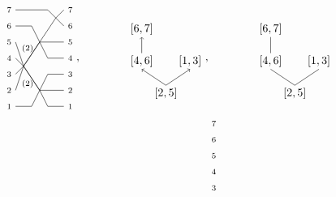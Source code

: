 \documentclass[11pt]{article}
\theoremstyle{definition}
\numberwithin{equation}{section}
\begin{document}
\begin{equation}\label{eq:posetex}
  \begin{gathered}
\begin{tikzpicture}[scale=.5,baseline=55]
  \node at (-.4,7) {$\scriptstyle 7$};
  \node at (-.4,6) {$\scriptstyle 6$};
  \node at (-.4,5) {$\scriptstyle 5$};
  \node at (-.4,4) {$\scriptstyle 4$};
  \node at (-.4,3) {$\scriptstyle 3$};
  \node at (-.4,2) {$\scriptstyle 2$};
  \node at (-.4,1) {$\scriptstyle 1$};
  \node at (3.4,7) {$\scriptstyle 7$};
  \node at (3.4,6) {$\scriptstyle 6$};
  \node at (3.4,5) {$\scriptstyle 5$};
  \node at (3.4,4) {$\scriptstyle 4$};
  \node at (3.4,3) {$\scriptstyle 3$};
  \node at (3.4,2) {$\scriptstyle 2$};
  \node at (3.4,1) {$\scriptstyle 1$};
\draw[-] (0,7) -- (2,7) -- (3,6);
\draw[-] (0,6) -- (1,6) -- (2,4) -- (3,4);
\draw[-] (0,5) -- (0.5,3.5) -- (1.5,2) -- (2,1) -- (3,1);
\draw[-] (0,4) -- (0.5,3.5) -- (1.5,2) -- (3,2);
\draw[-] (0,3) -- (0.5,3.5) -- (1.5,5) -- (3,5);
\draw[-] (0,2) -- (0.5,3.5) -- (1.5,5) -- (2.5,6.5) -- (3,7);
\draw[-] (0,1) -- (1,1) -- (2,3) -- (3,3);
\node at (0.75,4.6) {$\scriptstyle{(2)}$};
\node at (0.75,2.4) {$\scriptstyle{(2)}$};
\end{tikzpicture},
  \qquad \qquad
\begin{tikzpicture}[scale=.5,baseline=15]
\node at (0,1) {$[1, 3]$};            %
\node at (-1.5,-1) {$[2,5]$};          %
\node at (-3,1) {$[4,6]$};            %
\node at (-3,3) {$[6,7]$};            %
\draw[->] (-3,1.5) -- (-3,2.5);
\draw[<-] (0,0.5) -- (-1.5,-0.5);
\draw[<-] (-3,0.5) -- (-1.5,-0.5);
\end{tikzpicture},
  \qquad \qquad
\begin{tikzpicture}[scale=.5,baseline=15]
\node at (0,1) {$[1, 3]$};            %
\node at (-1.5,-1) {$[2,5]$};          %
\node at (-3,1) {$[4,6]$};            %
\node at (-3,3) {$[6,7]$};            %
\draw[-] (-3,1.5) -- (-3,2.5);
\draw[-] (0,0.5) -- (-1.5,-0.5);
\draw[-] (-3,0.5) -- (-1.5,-0.5);
\end{tikzpicture}\qquad\qquad \\
\qquad\qquad
\begin{tikzpicture}[scale=.5,baseline=55]
  \node at (-.4,7) {$\scriptstyle 7$};
  \node at (-.4,6) {$\scriptstyle 6$};
  \node at (-.4,5) {$\scriptstyle 5$};
  \node at (-.4,4) {$\scriptstyle 4$};
  \node at (-.4,3) {$\scriptstyle 3$};

\end{tikzpicture}
\end{gathered}
\end{equation}
\end{document}
